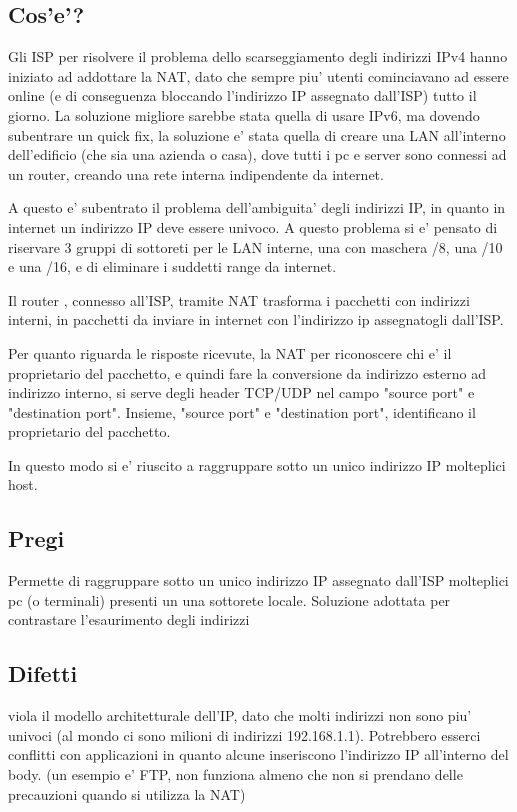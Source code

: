 \subsection{Cos'e'?}
Gli ISP per risolvere il problema dello scarseggiamento degli indirizzi IPv4 hanno iniziato ad addottare la NAT, dato che sempre piu' utenti cominciavano ad essere online (e di conseguenza bloccando l'indirizzo IP assegnato dall'ISP) tutto il giorno. La soluzione migliore sarebbe stata quella di usare IPv6, ma dovendo subentrare un quick fix, la soluzione e' stata quella di creare una LAN all'interno dell'edificio (che sia una azienda o casa), dove tutti i pc e server sono connessi ad un router, creando una rete interna indipendente da internet. 

A questo e' subentrato il problema dell'ambiguita' degli indirizzi IP, in quanto in internet un indirizzo IP deve essere univoco. A questo problema si e' pensato di riservare 3 gruppi di sottoreti per le LAN interne, una con maschera /8, una /10 e una /16, e di eliminare i suddetti range da internet.

Il router , connesso all'ISP, tramite NAT trasforma i pacchetti con indirizzi interni, in pacchetti da inviare in internet con l'indirizzo ip assegnatogli dall'ISP. 

Per quanto riguarda le risposte ricevute, la NAT per riconoscere chi e' il proprietario del pacchetto, e quindi fare la conversione da indirizzo esterno ad indirizzo interno, si serve degli header TCP/UDP nel campo "source port" e "destination port". Insieme, "source port" e "destination port", identificano il proprietario del pacchetto.

In questo modo si e' riuscito a raggruppare sotto un unico indirizzo IP molteplici host.
\subsection{Pregi}
Permette di raggruppare sotto un unico indirizzo IP assegnato dall'ISP molteplici pc (o terminali) presenti un una sottorete locale.
Soluzione adottata per contrastare l'esaurimento degli indirizzi
\subsection{Difetti}
viola il modello architetturale dell'IP, dato che molti indirizzi non sono piu' univoci (al mondo ci sono milioni di indirizzi 192.168.1.1).
Potrebbero esserci conflitti con applicazioni in quanto alcune inseriscono l'indirizzo IP all'interno del body. (un esempio e' FTP, non funziona almeno che non si prendano delle precauzioni quando si utilizza la NAT)
